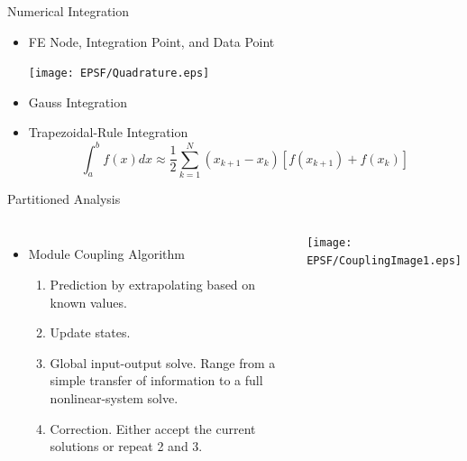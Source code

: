 \documentclass[xcolor=cmyk]{beamer}
\begin{document}
\begin{frame}{Numerical Integration}
    \begin{itemize}
        \item FE Node, Integration Point, and Data Point
        \begin{center}
            \texttt{[image: EPSF/Quadrature.eps]}
        \end{center}
        \item Gauss Integration
        \item Trapezoidal-Rule Integration
        \begin{equation*}
            \label{eqn:Trapezoidal}
            \int_a^b f(x) dx \approx \displaystyle \frac{1}{2} \sum_{k=1}^{N}(x_{k+1}-x_k)\left[f(x_{k+1}) + f(x_k)\right] 
        \end{equation*}  
    \end{itemize}
\end{frame}

\begin{frame}{Partitioned Analysis}
\begin{columns}[c]
   \column{2.3in}
   \begin{itemize}
       \item
       Module Coupling Algorithm
       \begin{enumerate}

\item Prediction by extrapolating based on known values. 

\item Update states. 

\item Global input-output solve. Range from a simple transfer of information to a full nonlinear-system solve. 

\item Correction. Either accept the current solutions or repeat 2 and 3.

\end{enumerate}

       
   \end{itemize}
   
   \column{2.3in}
   \begin{center}
    \texttt{[image: EPSF/CouplingImage1.eps]}
    \end{center}
    \end{columns}
\end{frame}
\end{document}
